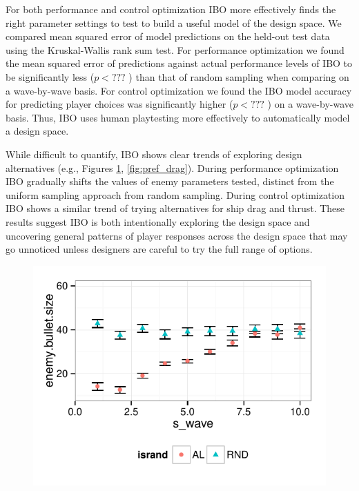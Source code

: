 \documentclass{sig-alternate}
\begin{document}
For both performance and control optimization IBO more effectively finds the right parameter settings to test to build a useful model of the design space.
We compared mean squared error of model predictions on the held-out test data using the Kruskal-Wallis rank sum test.
For performance optimization we found the mean squared error of predictions against actual performance levels of IBO to be significantly less ($p<???$ ) than that of random sampling when comparing on a wave-by-wave basis. 
For control optimization we found the IBO model accuracy for predicting player choices was significantly higher ($p<???$ ) on a wave-by-wave basis. Thus, IBO uses human playtesting more effectively to automatically model a design space.

While difficult to quantify, IBO shows clear trends of exploring design alternatives (e.g., Figures \ref{fig:reg_bulletsize}, \ref{fig:pref_drag}). During performance optimization IBO gradually shifts the values of enemy parameters tested, distinct from the uniform sampling approach from random sampling. During control optimization IBO shows a similar trend of trying alternatives for ship drag and thrust. These results suggest IBO is both intentionally exploring the design space and uncovering general patterns of player responses across the design space that may go unnoticed unless designers are careful to try the full range of options.

\begin{figure}[tbph]
\centering
\includegraphics[width=\linewidth]{reg_bulletsize}
\caption{}
\label{fig:reg_bulletsize}
\end{figure}
\end{document}
